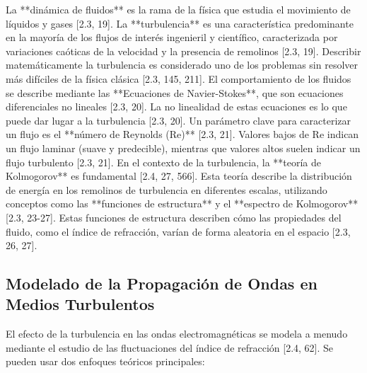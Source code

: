 La **dinámica de fluidos** es la rama de la física que estudia el movimiento de líquidos y gases [2.3, 19]. La **turbulencia** es una característica predominante en la mayoría de los flujos de interés ingenieril y científico, caracterizada por variaciones caóticas de la velocidad y la presencia de remolinos [2.3, 19]. Describir matemáticamente la turbulencia es considerado uno de los problemas sin resolver más difíciles de la física clásica [2.3, 145, 211]. El comportamiento de los fluidos se describe mediante las **Ecuaciones de Navier-Stokes**, que son ecuaciones diferenciales no lineales [2.3, 20]. La no linealidad de estas ecuaciones es lo que puede dar lugar a la turbulencia [2.3, 20]. Un parámetro clave para caracterizar un flujo es el **número de Reynolds (Re)** [2.3, 21]. Valores bajos de Re indican un flujo laminar (suave y predecible), mientras que valores altos suelen indicar un flujo turbulento [2.3, 21]. En el contexto de la turbulencia, la **teoría de Kolmogorov** es fundamental [2.4, 27, 566]. Esta teoría describe la distribución de energía en los remolinos de turbulencia en diferentes escalas, utilizando conceptos como las **funciones de estructura** y el **espectro de Kolmogorov** [2.3, 23-27]. Estas funciones de estructura describen cómo las propiedades del fluido, como el índice de refracción, varían de forma aleatoria en el espacio [2.3, 26, 27]. 

\subsection{Modelado de la Propagación de Ondas en Medios Turbulentos} 

El efecto de la turbulencia en las ondas electromagnéticas se modela a menudo mediante el estudio de las fluctuaciones del índice de refracción [2.4, 62]. Se pueden usar dos enfoques teóricos principales: 

